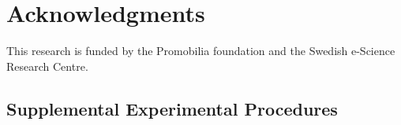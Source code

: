 




\section*{Acknowledgments}
This research is funded by the Promobilia foundation and the Swedish
e-Science Research Centre.

{\small
}

\begin{appendices}
	\renewcommand{\thesection}{\Roman{section}}
	
	
	
	\section{Supplemental Experimental Procedures}
	
	
	
	
	
	
	
\end{appendices}
%




